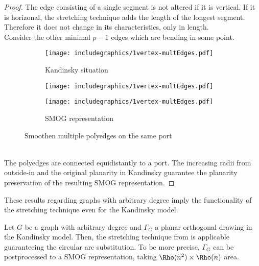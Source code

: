 \begin{proof}
	The edge consisting of a single segment is not altered if it is vertical. If it is horizonal, the stretching technique adds the length of the longest segment. Therefore it does not change in its characteristics, only in length.\\
	Consider the other minimal $p-1$ edges which are bending in some point.\\
	\begin{figure}[h]
		\centering
		\begin{subfigure}{0.3\textwidth}
			\centering
			\texttt{[image: includegraphics/1vertex-multEdges.pdf]}
			\caption{Kandinsky situation}
		\end{subfigure}
	    \begin{subfigure}{0.3\textwidth}
		    \centering
		    \texttt{[image: includegraphics/1vertex-multEdges.pdf]}
		    \caption{}
	    \end{subfigure}
        \begin{subfigure}{0.3\textwidth}
	        \centering
	        \texttt{[image: includegraphics/1vertex-multEdges.pdf]}
	        \caption{SMOG representation}
        \end{subfigure}
        \caption{Smoothen multiple polyedges on the same port}
	\end{figure}
\\
The polyedges are connected equidistantly to a port. The increasing radii from outside-in and the original planarity in Kandinsky guarantee the planarity preservation of the resulting SMOG representation.	
\end{proof}
These results regarding graphs with arbitrary degree imply the functionality of the stretching technique even for the Kandinsky model. \cite[p. 582, Section 4.1]{SMOG}
\begin{corollary}
	Let $G$ be a graph with arbitrary degree and $\Gamma_G$ a planar orthogonal drawing in the Kandinsky model. Then, the stretching technique from \cite[p. 582, Section 4.1]{SMOG} is applicable guaranteeing the circular arc substitution. To be more precise, $\Gamma_G$ can be postprocessed to a SMOG representation, taking $\Rho(n^2) \times \Rho(n)$ area.
\end{corollary}

